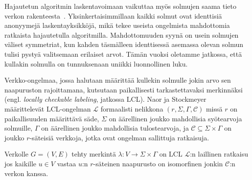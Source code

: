 \documentclass[12pt,finnish]{tktltiki2}
\theoremstyle{definition}
\theoremstyle{remark}
\begin{document}
Hajautetun algoritmin laskentavoimaan vaikuttaa myös solmujen saama tieto verkon rakenteesta~\cite{linial92}. Yksinkertaisimmillaan kaikki solmut ovat identtisiä anonyymejä laskentayksikköjä, mikä tekee useista ongelmista mahdottomia ratkaista hajautetulla algoritmilla. Mahdottomuuden syynä on usein solmujen väliset symmetriat, kun kahden täsmälleen identtisessä asemassa olevan solmun tulisi pystyä valitsemaan erilaiset arvot. Tämän vuoksi oletamme jatkossa, että kullakin solmulla on tunnuksenaan uniikki luonnollinen luku.

Verkko-ongelmaa, jossa halutaan määrittää kullekin solmulle jokin arvo sen naapuruston rajoittamana, kutsutaan paikallisesti tarkastettavaksi merkinnäksi (engl. \textit{locally checkable labeling}, jatkossa LCL). Naor ja Stockmeyer~\cite{naor95} määrittelevät LCL-ongelman $\mathcal{L}$ formaalisti nelikkona $(r, \Sigma, \Gamma, \mathcal{C})$ missä $r$ on paikallisuuden määrittävä säde, $\Sigma$ on äärellinen joukko mahdollisia syötearvoja solmuille, $\Gamma$ on äärellinen joukko mahdollisia tulostearvoja, ja $\mathcal{C} \subseteq \Sigma \times \Gamma$ on joukko $r$-säteisiä verkkoja, jotka ovat ongelman sallittuja ratkaisuja.

Verkolle $G = (V, E)$ tehty merkintä $\lambda : V \rightarrow \Sigma \times \Gamma$ on LCL $\mathcal{L}$:n laillinen ratkaisu jos kaikille $u \in V$ vastaa $u$:n $r$-säteinen naapurusto on isomorfinen jonkin $\mathcal{C}$:n verkon kanssa.





%
%
% 
%







% 
\end{document}
